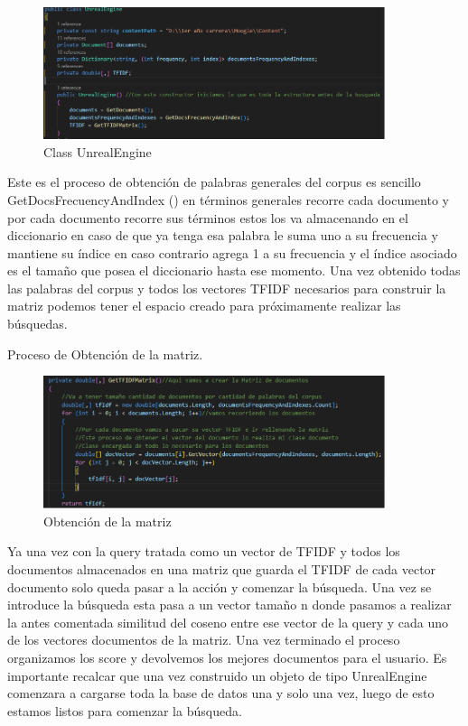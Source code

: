 \documentclass[a4paper,12pt]{article}
\begin{document}
\begin{figure}[h]
    \center
    \includegraphics[width=10cm]{Pictures For Moogle!/Figure3.png}
    \caption{Class UnrealEngine}
    \label{fig:logo}
\end{figure}

Este es el proceso de obtención de palabras generales del corpus es sencillo  GetDocsFrecuencyAndIndex () en términos generales recorre cada documento y por cada documento recorre sus términos estos los va almacenando en el diccionario en caso de que ya tenga esa palabra le suma uno a su frecuencia y mantiene su índice en caso contrario agrega 1 a su frecuencia y el índice asociado es el tamaño que posea el diccionario hasta ese momento.
Una vez obtenido todas las palabras del corpus y todos los vectores TFIDF necesarios para construir la matriz podemos tener el espacio creado para próximamente realizar las búsquedas.

Proceso de Obtención de la matriz.

\begin{figure}[h]
    \center
    \includegraphics[width=10cm]{Pictures For Moogle!/Figure4.png}
    \caption{Obtención de la matriz}
    \label{fig:logo}
\end{figure}

Ya una vez con la query tratada como un vector de TFIDF y todos los documentos almacenados en una matriz que guarda el TFIDF de cada vector documento solo queda pasar a la acción y comenzar la búsqueda. Una vez se introduce la búsqueda esta pasa a un vector tamaño n donde pasamos a realizar la antes comentada similitud del coseno entre ese vector de la query y cada uno de los vectores documentos de la matriz. Una vez terminado el proceso organizamos los score y devolvemos los mejores documentos para el usuario.
Es importante recalcar que una vez construido un objeto de tipo UnrealEngine comenzara a cargarse toda la base de datos una y solo una vez, luego de esto estamos listos para comenzar la búsqueda.
\end{document}
